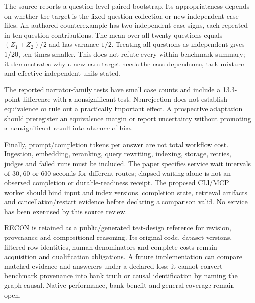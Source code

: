The source reports a question-level paired bootstrap. Its appropriateness
depends on whether the target is the fixed question collection or new
independent case files. An authored counterexample has two independent case
signs, each repeated in ten question contributions. The mean over all twenty
questions equals $(Z_1+Z_2)/2$ and has variance $1/2$. Treating all questions
as independent gives $1/20$, ten times smaller. This does not refute every
within-benchmark summary; it demonstrates why a new-case target needs the
case dependence, task mixture and effective independent units stated.
\citep{exec23_recon_reference}

The reported narrator-family tests have small case counts and include a
13.3-point difference with a nonsignificant test. Nonrejection does not
establish equivalence or rule out a practically important effect. A prospective
adaptation should preregister an equivalence margin or report uncertainty
without promoting a nonsignificant result into absence of bias.
\citep{exec23_recon_original}

Finally, prompt/completion tokens per answer are not total workflow cost.
Ingestion, embedding, reranking, query rewriting, indexing, storage, retries,
judges and failed runs must be included. The paper specifies service wait
intervals of 30, 60 or 600 seconds for different routes; elapsed waiting alone
is not an observed completion or durable-readiness receipt. The proposed
CLI/MCP worker should bind input and index versions, completion state,
retrieval artifacts and cancellation/restart evidence before declaring a
comparison valid. No service has been exercised by this source review.
\citep{exec23_recon_original}

RECON is retained as a public/generated test-design reference for revision,
provenance and compositional reasoning. Its original code, dataset versions,
filtered row identities, human denominators and complete costs remain
acquisition and qualification obligations. A future implementation can compare
matched evidence and answerers under a declared loss; it cannot convert
benchmark provenance into bank truth or causal identification by naming the
graph causal. Native performance, bank benefit and general coverage remain open.


